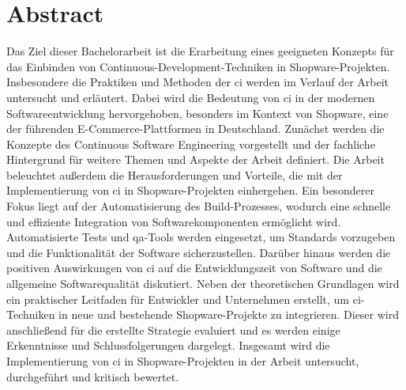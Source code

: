 
\section*{Abstract} \label{sec:00-abstract}

Das Ziel dieser Bachelorarbeit ist die Erarbeitung eines geeigneten Konzepts für das Einbinden von
Continuous-Development-Techniken in Shopware-Projekten.
Insbesondere die Praktiken und Methoden der \acrfull{ci} werden im Verlauf der Arbeit
untersucht und erläutert.
Dabei wird die Bedeutung von \acrshort{ci} in der modernen Softwareentwicklung hervorgehoben, besonders im Kontext
von Shopware, eine der führenden E-Commerce-Plattformen in Deutschland.
Zunächst werden die Konzepte des Continuous Software Engineering vorgestellt und der fachliche Hintergrund für
weitere Themen und Aspekte der Arbeit definiert.
Die Arbeit beleuchtet außerdem die Herausforderungen und Vorteile, die mit der Implementierung von \acrshort{ci} in
Shopware-Projekten einhergehen.
Ein besonderer Fokus liegt auf der Automatisierung des Build-Prozesses, wodurch eine schnelle und effiziente
Integration von Softwarekomponenten ermöglicht wird.
Automatisierte Tests und \acrshort{qa}-Tools werden eingesetzt, um Standards vorzugeben und die Funktionalität der
Software sicherzustellen.
Darüber hinaus werden die positiven Auswirkungen von \acrshort{ci} auf die Entwicklungszeit von Software und die
allgemeine Softwarequalität diskutiert.
Neben der theoretischen Grundlagen wird ein praktischer Leitfaden für Entwickler und Unternehmen erstellt, um
\acrshort{ci}-Techniken in neue und bestehende Shopware-Projekte zu integrieren.
Dieser wird anschließend für die erstellte Strategie evaluiert und es werden einige Erkenntnisse und Schlussfolgerungen
dargelegt.
Insgesamt wird die Implementierung von \acrlong{ci} in Shopware-Projekten in der Arbeit untersucht,
durchgeführt und kritisch bewertet.

\clearpage
